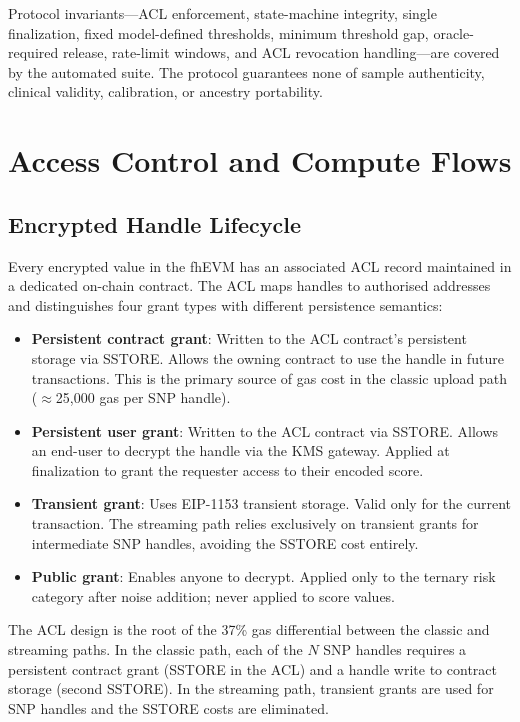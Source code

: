\documentclass[10pt,twocolumn]{article}
\begin{document}
Protocol invariants---ACL enforcement, state-machine integrity, single finalization,
fixed model-defined thresholds, minimum threshold gap, oracle-required release,
rate-limit windows, and ACL revocation handling---are covered by the automated suite.
The protocol guarantees none of sample authenticity, clinical validity, calibration,
or ancestry portability.

\section{Access Control and Compute Flows}
\label{sec:acl}

\subsection{Encrypted Handle Lifecycle}

Every encrypted value in the fhEVM has an associated ACL record maintained in a
dedicated on-chain contract.  The ACL maps handles to authorised addresses and
distinguishes four grant types with different persistence semantics:

\begin{itemize}
  \item \textbf{Persistent contract grant}: Written to the ACL contract's persistent
        storage via SSTORE.  Allows the owning contract to use the handle in future
        transactions.  This is the primary source of gas cost in the classic upload
        path ($\approx$25,000 gas per SNP handle).
  \item \textbf{Persistent user grant}: Written to the ACL contract via SSTORE.
        Allows an end-user to decrypt the handle via the KMS gateway.  Applied at
        finalization to grant the requester access to their encoded score.
  \item \textbf{Transient grant}: Uses EIP-1153 transient storage.  Valid only for
        the current transaction.  The streaming path relies exclusively on transient
        grants for intermediate SNP handles, avoiding the SSTORE cost entirely.
  \item \textbf{Public grant}: Enables anyone to decrypt.  Applied only to the
        ternary risk category after noise addition; never applied to score values.
\end{itemize}

The ACL design is the root of the 37\% gas differential between the classic and
streaming paths.  In the classic path, each of the $N$ SNP handles requires a
persistent contract grant (SSTORE in the ACL) and a handle write to contract
storage (second SSTORE).  In the streaming path, transient grants are used for
SNP handles and the SSTORE costs are eliminated.
\end{document}
